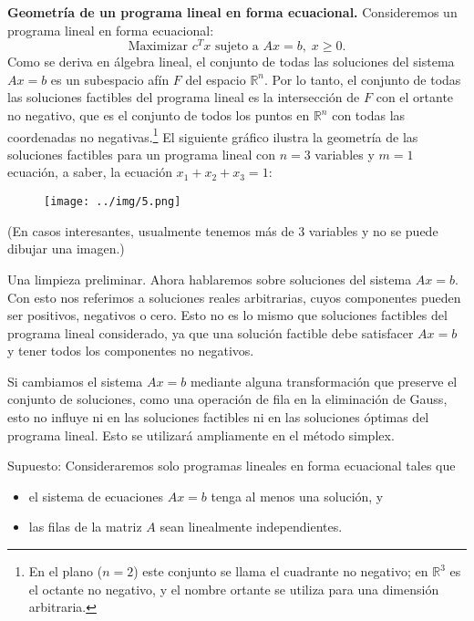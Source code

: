 \documentclass{article}
\begin{document}
    \textbf{Geometría de un programa lineal en forma ecuacional.} Consideremos un programa lineal en forma ecuacional:
    \[
    \text{Maximizar } c^T x \text{ sujeto a } Ax = b, \; x \geq 0.
    \]
    Como se deriva en álgebra lineal, el conjunto de todas las soluciones del sistema \( Ax = b \) es un subespacio afín \( F \) del espacio \( \mathbb{R}^n \). Por lo tanto, el conjunto de todas las soluciones factibles del programa lineal es la intersección de \( F \) con el ortante no negativo, que es el conjunto de todos los puntos en \( \mathbb{R}^n \) con todas las coordenadas no negativas.\footnote{En el plano (\(n = 2\)) este conjunto se llama el cuadrante no negativo; en \(\mathbb{R}^3\) es el octante no negativo, y el nombre ortante se utiliza para una dimensión arbitraria.
}
El siguiente gráfico ilustra la geometría de las soluciones factibles para un programa lineal con \( n = 3 \) variables y \( m = 1 \) ecuación, a saber, la ecuación \( x_1 + x_2 + x_3 = 1 \):
\newpage 

\begin{figure}[H] %
\centering %
\texttt{[image: ../img/5.png]} %
\label{fig:imagen} %
\end{figure}


(En casos interesantes, usualmente tenemos más de 3 variables y no se puede dibujar una imagen.)

Una limpieza preliminar. Ahora hablaremos sobre soluciones del sistema \( Ax = b \). Con esto nos referimos a soluciones reales arbitrarias, cuyos componentes pueden ser positivos, negativos o cero. Esto no es lo mismo que soluciones factibles del programa lineal considerado, ya que una solución factible debe satisfacer \( Ax = b \) y tener todos los componentes no negativos.

Si cambiamos el sistema \( Ax = b \) mediante alguna transformación que preserve el conjunto de soluciones, como una operación de fila en la eliminación de Gauss, esto no influye ni en las soluciones factibles ni en las soluciones óptimas del programa lineal. Esto se utilizará ampliamente en el método simplex.

Supuesto: Consideraremos solo programas lineales en forma ecuacional tales que
\begin{itemize}
    \item el sistema de ecuaciones \( Ax = b \) tenga al menos una solución, y
    \item las filas de la matriz \( A \) sean linealmente independientes.
\end{itemize}
\end{document}
